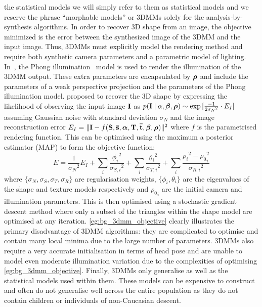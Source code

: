 the statistical models we will simply refer to them as statistical models and
we reserve the phrase ``morphable models'' or 3DMMs solely for the 
analysis-by-synthesis algorithms. In order to recover 3D shape from an image,
the objective minimized is the error between the synthesized image of the
3DMM and the input image. Thus, 3DMMs must explicitly model the rendering
method and require both synthetic camera parameters and a parametric model
of lighting. In~\cite{volker1999morphable}, 
the Phong illumination~\cite{tuong1973illumination} model is used to render
the illumination of the 3DMM output. These extra parameters are encapsulated
by $\boldsymbol{\mathbf{\rho}}$ and include the parameters of a weak perspective projection
and the parameters of the Phong illumination model.
\citet{volker1999morphable} proposed to recover the 3D shape by expressing
the likelihood of observing the input image $\boldsymbol{\mathbf{I}}$ as
$p(\boldsymbol{\mathbf{I}} \:\boldsymbol{\mathbf{\vert}}\:{\alpha},\boldsymbol{\mathbf{\beta}},\boldsymbol{\mathbf{\rho}}) \sim \exp{[\frac{-1}{2{\sigma_N}^2} \cdot E_I]}$
assuming Gaussian noise with standard deviation $\sigma_N$ and the image
reconstruction error $E_I = \lVert \boldsymbol{\mathbf{I}} - f(\boldsymbol{\mathbf{S}}, \boldsymbol{\mathbf{\bar{s}}}, \boldsymbol{\mathbf{\alpha}}, \boldsymbol{\mathbf{T}}, \boldsymbol{\mathbf{\bar{t}}}, \boldsymbol{\mathbf{\beta}}, \boldsymbol{\mathbf{\rho}}) \rVert^2$ where $f$ is the parametrised rendering function. This
can be optimised using the maximum a posterior estimator (MAP) to form
the objective function:
\begin{equation}\label{eg:bg_3dmm_objective}
	E = \frac{1}{{\sigma_N}^2} E_I + \sum_i \frac{{\phi_i}^2}{{\sigma_{S,i}}^2} + \sum_i \frac{{\theta_i}^2}{{\sigma_{T,i}}^2} + \sum_i \frac{{\rho_i}^2 - {\rho_0}_i^2}{{\sigma_{R,i}}^2} 
\end{equation}
where $\{\sigma_N,\sigma_S,\sigma_T,\sigma_R\}$ are regularisation weights,
$\{\phi_i, \theta_i \}$ are the eigenvalues of the shape and texture models
respectively and ${\rho_0}_i$ are the initial camera and illumination parameters.
This is then optimised using a stochastic gradient descent method where
only a subset of the triangles within the shape model are optimised at any
iteration. \cref{eg:bg_3dmm_objective} clearly illustrates the primary
disadvantage of 3DMM algorithms: they are complicated to optimise and contain
many local minima due to the large number of parameters. 3DMMs also require
a very accurate initialisation in terms of head pose and are unable to model
even moderate illumination variation due to the complexities of optimising
\cref{eg:bg_3dmm_objective}. Finally, 3DMMs only generalise as well as the
statistical models used within them. These models can be expensive to 
construct and often do not generalise well across the entire population as
they do not contain children or individuals of non-Caucasian descent.

